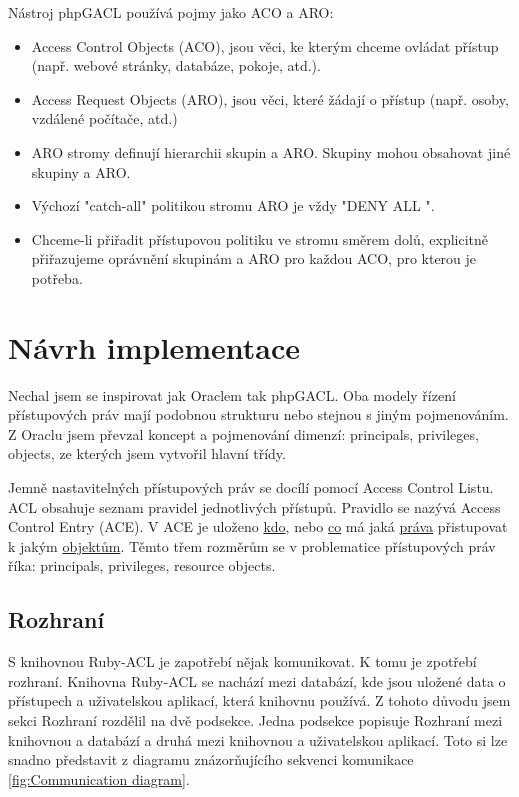 Nástroj phpGACL používá pojmy jako ACO a ARO:
\begin{itemize}
\item Access Control Objects (ACO), jsou věci, ke kterým chceme ovládat přístup (např. webové stránky, databáze, pokoje, atd.).
\item Access Request Objects (ARO), jsou věci, které žádají o přístup (např. osoby, vzdálené počítače, atd.)
\item ARO stromy definují hierarchii skupin a ARO. Skupiny mohou obsahovat jiné skupiny a ARO.
\item Výchozí "catch-all" politikou stromu ARO je vždy "DENY ALL ".
\item Chceme-li přiřadit přístupovou politiku ve stromu směrem dolů, explicitně přiřazujeme oprávnění skupinám a ARO pro každou ACO, pro kterou je potřeba.
\end{itemize}

\section{Návrh implementace}
Nechal jsem se inspirovat jak Oraclem tak phpGACL. Oba modely řízení přístupových práv mají podobnou strukturu nebo stejnou s jiným pojmenováním. Z Oraclu jsem převzal koncept a pojmenování dimenzí: principals, privileges, objects, ze kterých jsem vytvořil hlavní třídy. 

Jemně nastavitelných přístupových práv se docílí pomocí Access Control Listu. ACL obsahuje seznam pravidel jednotlivých přístupů. Pravidlo se nazývá Access Control Entry (ACE). V ACE je uloženo \underline{kdo}, nebo \underline{co} má jaká \underline{práva} přistupovat k jakým \underline{objektům}. Těmto třem rozměrům se v problematice přístupových práv říka: principals, privileges, resource objects.



\subsection{Rozhraní}
S knihovnou Ruby-ACL je zapotřebí nějak komunikovat. K tomu je zpotřebí rozhraní. Knihovna Ruby-ACL se nachází mezi databází, kde jsou uložené data o přístupech a uživatelskou aplikací, která knihovnu používá. Z tohoto důvodu jsem sekci Rozhraní rozdělil na dvě podsekce. Jedna podsekce popisuje Rozhraní mezi knihovnou a databází a druhá mezi knihovnou a uživatelskou aplikací. Toto si lze snadno představit z diagramu znázorňujícího sekvenci komunikace \ref{fig:Communication diagram}.


